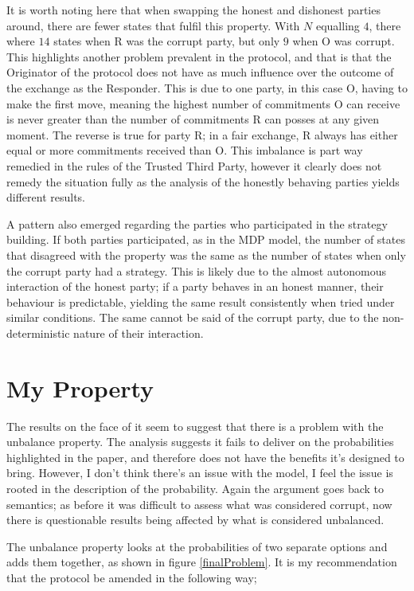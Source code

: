 \documentclass{l4proj}
\begin{document}
It is worth noting here that when swapping the honest and dishonest parties around, there are fewer states that fulfil this property. With $N$ equalling $4$, there where $14$ states when R was the corrupt party, but only $9$ when O was corrupt.  This highlights another problem prevalent in the protocol, and that is that the Originator of the protocol does not have as much influence over the outcome of the exchange as the Responder. This is due to one party, in this case O, having to make the first move, meaning the highest number of commitments O can receive is never greater than the number of commitments R can posses at any given moment. The reverse is true for party R; in a fair exchange, R always has either equal or more commitments received than O. This imbalance is part way remedied in the rules of the Trusted Third Party, however it clearly does not remedy the situation fully as the analysis of the honestly behaving parties yields different results.

A pattern also emerged regarding the parties who participated in the strategy building. If both parties participated, as in the MDP model, the number of states that disagreed with the property was the same as the number of states when only the corrupt party had a strategy. This is likely due to the almost autonomous interaction of the honest party; if a party behaves in an honest manner, their behaviour is predictable, yielding the same result consistently when tried under similar conditions. The same cannot be said of the corrupt party, due to the non-deterministic nature of their interaction.

\section{My Property}

The results on the face of it seem to suggest that there is a problem with the unbalance property. The analysis suggests it fails to deliver on the probabilities highlighted in the paper, and therefore does not have the benefits it's designed to bring. However, I don't think there's an issue with the model, I feel the issue is rooted in the description of the probability. Again the argument goes back to semantics; as before it was difficult to assess what was considered corrupt, now there is questionable results being affected by what is considered unbalanced. 

The unbalance property looks at the probabilities of two separate options and adds them together, as shown in figure \ref{finalProblem}. It is my recommendation that the protocol be amended in the following way;
\end{document}
